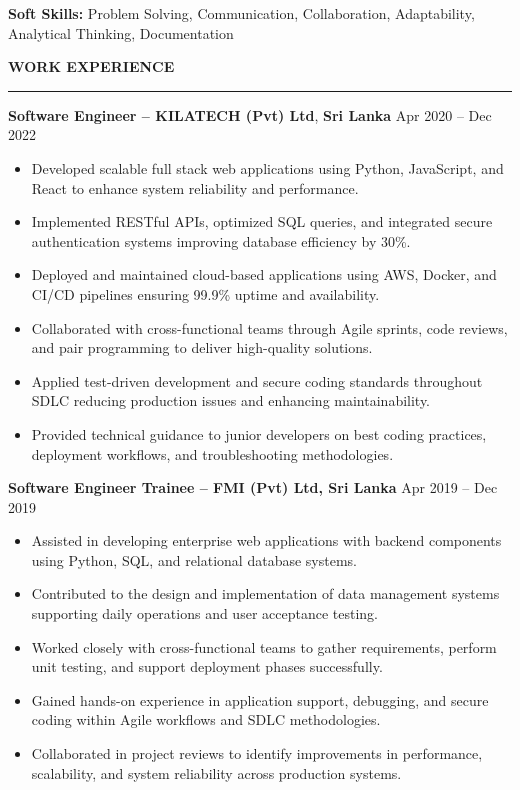 \documentclass[10pt,letterpaper]{article}
\begin{document}
\textbf{Soft Skills:} Problem Solving, Communication, Collaboration, Adaptability, Analytical Thinking, Documentation

\vspace{8pt}

\textbf{WORK EXPERIENCE}\\[-8pt]
\noindent\rule{\textwidth}{1pt}

\vspace{-2pt}

\textbf{Software Engineer -- KILATECH (Pvt) Ltd}, \textbf{Sri Lanka} \hfill Apr 2020 -- Dec 2022

\vspace{-1pt}

\begin{itemize}
\item Developed scalable full stack web applications using Python, JavaScript, and React to enhance system reliability and performance.
\item Implemented RESTful APIs, optimized SQL queries, and integrated secure authentication systems improving database efficiency by 30\%.
\item Deployed and maintained cloud-based applications using AWS, Docker, and CI/CD pipelines ensuring 99.9\% uptime and availability.
\item Collaborated with cross-functional teams through Agile sprints, code reviews, and pair programming to deliver high-quality solutions.
\item Applied test-driven development and secure coding standards throughout SDLC reducing production issues and enhancing maintainability.
\item Provided technical guidance to junior developers on best coding practices, deployment workflows, and troubleshooting methodologies.
\end{itemize}

\textbf{Software Engineer Trainee -- FMI (Pvt) Ltd, Sri Lanka} \hfill Apr 2019 -- Dec 2019

\vspace{-1pt}

\begin{itemize}
\item Assisted in developing enterprise web applications with backend components using Python, SQL, and relational database systems.
\item Contributed to the design and implementation of data management systems supporting daily operations and user acceptance testing.
\item Worked closely with cross-functional teams to gather requirements, perform unit testing, and support deployment phases successfully.
\item Gained hands-on experience in application support, debugging, and secure coding within Agile workflows and SDLC methodologies.
\item Collaborated in project reviews to identify improvements in performance, scalability, and system reliability across production systems.
\end{itemize}
\end{document}
